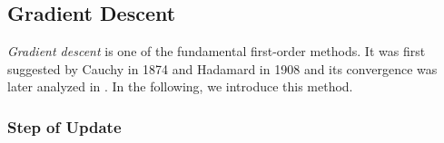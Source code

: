 \documentclass[lang=cn,10pt]{gorgeousnbook}
\numberwithin{equation}{section}%
\numberwithin{figure}{section}%
\begin{document}
\subsection{Gradient Descent}\label{section_gradient_descent}

\textit{Gradient descent} is one of the fundamental first-order methods. It was first suggested by Cauchy in 1874 \cite{lemarechal2012cauchy} and Hadamard in 1908 \cite{hadamard1908memoire} and its convergence was later analyzed in \cite{curry1944method}. In the following, we introduce this method. 

\subsubsection{Step of Update}\label{section_GD_step_update}
\end{document}
